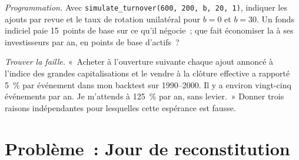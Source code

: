 \begin{exercise}[$\star\star\star$]\label{exo:m1:index-construction-and-rebalancing:7}
\emph{Programmation.} Avec \texttt{simulate\_turnover(600, 200, b, 20, 1)}, indiquer
les ajouts par revue et le taux de rotation unilatéral pour $b = 0$ et $b = 30$.
Un fonds indiciel paie 15~points de base sur ce qu'il négocie~; que fait
économiser la  à ses investisseurs par an, en points de base d'actifs~?
\end{exercise}

\begin{exercise}[$\star\star\star$]\label{exo:m1:index-construction-and-rebalancing:8}
\emph{Trouver la faille.} «~Acheter à l'ouverture suivante chaque ajout annoncé à l'indice des grandes
capitalisations et le vendre à la clôture effective a rapporté 5~\% par événement dans mon
backtest sur 1990--2000. Il y a environ vingt-cinq événements par an. Je m'attends à
125~\% par an, sans levier.~» Donner trois raisons indépendantes pour lesquelles
cette espérance est fausse.
\end{exercise}

\section{Problème~: Jour de reconstitution}

